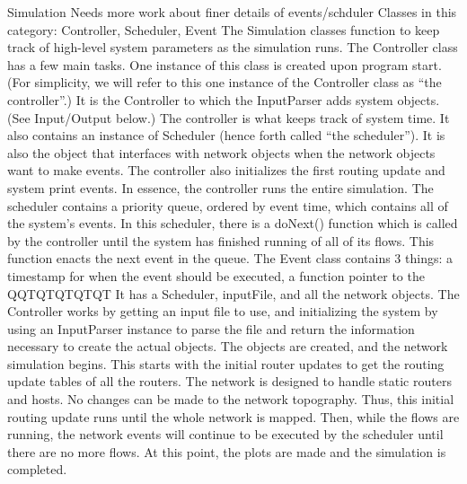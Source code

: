 \documentclass{article}
\begin{document}
Simulation Needs more work about finer details of events/schduler 
    Classes in this category: Controller, Scheduler, Event
    The Simulation classes function to keep track of high-level system parameters as the simulation runs. 
The Controller class has a few main tasks. One instance of this class is created upon program start. (For simplicity, we will refer to this one instance of the Controller class as “the controller”.) It is the Controller to which the InputParser adds system objects. (See Input/Output below.) The controller is what keeps track of system time. It also contains an instance of Scheduler (hence forth called “the scheduler”). It is also the object that interfaces with network objects when the network objects want to make events. The controller also initializes the first routing update and system print events. In essence, the controller runs the entire simulation.
The scheduler contains a priority queue, ordered by event time, which contains all of the system’s events. In this scheduler, there is a doNext() function which is called by the controller until the system has finished running of all of its flows. This function enacts the next event in the queue. 
The Event class contains 3 things: a timestamp for when the event should be executed, a function pointer to the QQTQTQTQTQT
It has a Scheduler, inputFile, and all the network objects. The Controller works by getting an input file to use, and initializing the system by using an InputParser instance to parse the file and return the information necessary to create the actual objects. The objects are created, and the network simulation begins. This starts with the initial router updates to get the routing update tables of all the routers. The network is designed to handle static routers and hosts. No changes can be made to the network topography. Thus, this initial routing update runs until the whole network is mapped. Then, while the flows are running, the network events will continue to be executed by the scheduler until there are no more flows. At this point, the plots are made and the simulation is completed.
\end{document}
